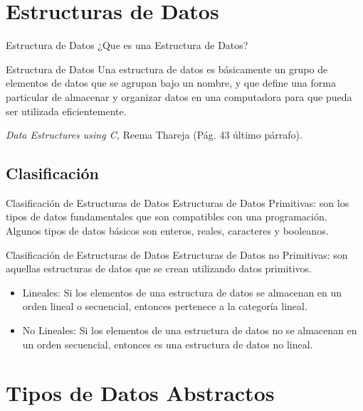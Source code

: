 \documentclass[11pt]{beamer}
\begin{document}
\section{Estructuras de Datos}

\begin{frame}{Estructura de Datos}
¿Que es una Estructura de Datos? \pause
\begin{block}{Estructura de Datos}
Una estructura de datos es básicamente un
grupo de elementos de datos que se agrupan
bajo un nombre, y que define una forma
particular de almacenar y organizar datos en
una computadora para que pueda ser utilizada
eficientemente. \\
\begin{flushright}
{\scriptsize \textit{Data Estructures using C,} Reema Thareja (Pág. 43 último párrafo).}
\end{flushright}
\end{block}
\end{frame}
\subsection{Clasificación}
\begin{frame}{Clasificación de Estructuras de Datos}
Estructuras de Datos \alert{Primitivas}: son los tipos de datos fundamentales que son compatibles con una programación. Algunos tipos de datos básicos son enteros, reales, caracteres y booleanos.
\end{frame}

\begin{frame}{Clasificación de Estructuras de Datos}
Estructuras de Datos \alert{no Primitivas}: son aquellas
estructuras de datos que se crean utilizando datos primitivos.
\pause
\begin{itemize}
\item \alert{Lineales:} Si los elementos de una estructura de datos se almacenan en
un orden lineal o secuencial, entonces pertenece a la categoría lineal.
\pause
\item \alert{No Lineales:} Si los elementos de una estructura de datos no se
almacenan en un orden secuencial, entonces es una estructura de
datos no lineal.
\end{itemize}

\end{frame}

\section{Tipos de Datos Abstractos}
\end{document}
